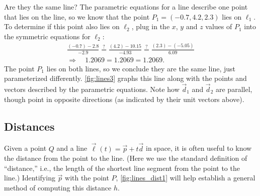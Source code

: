 {Are they the same line? The parametric equations for a line describe one point that lies on the line, so we know that the point $P_1 = (-0.7,4.2,2.3)$ lies on $\ell_1$. To determine if this point also lies on $\ell_2$, plug in the $x$, $y$ and $z$ values of $P_1$ into the symmetric equations for $\ell_2$:
\begin{multline*}
\frac{(-0.7)-2.8}{-2.9} \stackrel{?}{=} \frac{(4.2)-10.15}{-4.93} \stackrel{?}{=} \frac{(2.3)-(-5.05)}{6.09} \\
\Rightarrow \quad 1.2069=1.2069=1.2069.
\end{multline*}
%
The point $P_1$ lies on both lines, so we conclude they are the same line, just parameterized differently. \autoref{fig:lines3} graphs this line along with the points and vectors described by the parametric equations. Note how $\vec d_1$ and $\vec d_2$ are parallel, though point in opposite directions (as indicated by their unit vectors above).}

\subsection{Distances}


Given a point $Q$ and a line $\vec\ell(t) = \vec p+t\vec d$ in space, it is often useful to know the distance from the point to the line. (Here we use the standard definition of ``distance,'' i.e., the length of the shortest line segment from the point to the line.) Identifying $\vec p$ with the point $P$, \autoref{fig:lines_dist1} will help establish a general method of computing this distance $h$.

